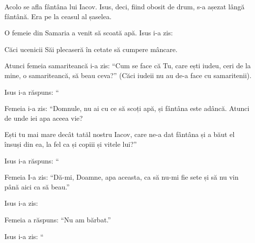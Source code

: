{Acolo se afla fântâna lui Iacov. Isus, deci, fiind obosit de drum, s-a așezat lângă fântână. Era pe la ceasul al șaselea.


\par }{\PP {}O femeie din Samaria a venit să scoată apă. Isus i-a zis:
{}

Căci ucenicii Săi plecaseră în cetate să cumpere mâncare.


\par }{\PP {}Atunci femeia samariteancă i-a zis: “Cum se face că Tu, care ești iudeu, ceri de la mine, o samariteancă, să beau ceva?” (Căci iudeii nu au de-a face cu samaritenii).


\par }{\PP {}Isus i-a răspuns: “{}


\par }{\PP {}Femeia i-a zis: “Domnule, nu ai cu ce să scoți apă, și fântâna este adâncă. Atunci de unde iei apa aceea vie?

Ești tu mai mare decât tatăl nostru Iacov, care ne-a dat fântâna și a băut el însuși din ea, la fel ca și copiii și vitele lui?”


\par }{\PP {}Isus i-a răspuns: “{}



\par }{\PP {}Femeia I-a zis: “Dă-mi, Doamne, apa aceasta, ca să nu-mi fie sete și să nu vin până aici ca să beau.”


\par }{\PP {}Isus i-a zis:
{}


\par }{\PP {}Femeia a răspuns: “Nu am bărbat.”

\par }{\PP Isus i-a zis: “{}



}
